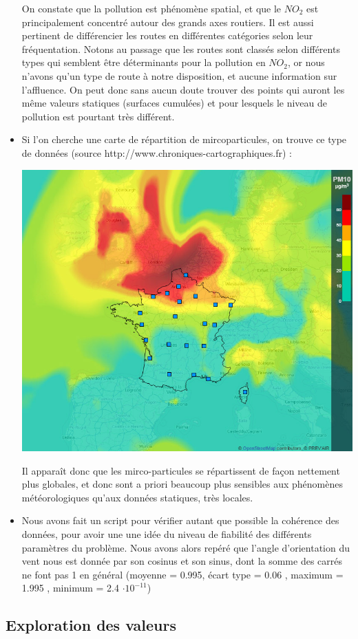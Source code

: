 \begin{itemize}
    On constate que la pollution est phénomène spatial, et que le $NO_2$ est principalement concentré autour des grands axes routiers. Il est aussi pertinent de différencier les routes en différentes catégories selon leur fréquentation. Notons au passage que les routes sont classés selon différents types qui semblent être déterminants pour la pollution en $NO_2$, or nous n'avons qu'un type de route à notre disposition, et aucune information sur l'affluence. On peut donc sans aucun doute trouver des points qui auront les même valeurs statiques (surfaces cumulées) et pour lesquels le niveau de pollution est pourtant très différent.   
  \item
  	Si l'on cherche une carte de répartition de mircoparticules, on trouve ce type de données (source http://www.chroniques-cartographiques.fr) :
  	\begin{center}
  		\includegraphics[width = 0.5\linewidth]{images/francepm10.jpg}
  	\end{center}    
  	Il apparaît donc que les mirco-particules se répartissent de façon nettement plus globales, et donc sont a priori beaucoup plus sensibles aux phénomènes météorologiques qu'aux données statiques, très locales.
  \item
    Nous avons fait un script pour vérifier autant que possible la cohérence des données, pour avoir une une idée du niveau de fiabilité des différents paramètres du problème. Nous avons alors repéré que l'angle d'orientation du vent nous est donnée par son cosinus et son sinus, dont la somme des carrés ne font pas 1 en général (moyenne = 0.995, écart type =  0.06 , maximum =  1.995 , minimum = 2.4 $\cdot 10^{-11}$)
 
    
\end{itemize}



\subsection{Exploration des valeurs}

